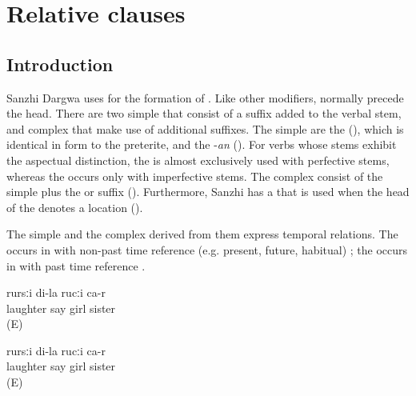 \chapter{Relative clauses}
\label{cpt:Relative clauses}



\section{Introduction}
\label{sec:relativeclausesintro}

Sanzhi Dargwa uses  for the formation of . Like other modifiers,  normally precede the head. There are two simple  that consist of a suffix added to the verbal stem, and complex  that make use of additional suffixes. The simple  are the  (), which is identical in form to the preterite, and the  -\textit{an} (). For verbs whose stems exhibit the aspectual distinction, the  is almost exclusively used with perfective stems, whereas the  occurs only with imperfective stems. The complex  consist of the simple  plus the   or suffix  (). Furthermore, Sanzhi has a  that is used when the head of the  denotes a location ().

The simple  and the complex  derived from them express temporal relations. The  occurs in  with non-past time reference (e.g. present, future, habitual) ; the  occurs in  with past time reference .
%
\begin{exe}
	\ex	\label{ex:The girl who is laughing is my sister}
	\gll	[ħaˁħaˁ	r-ik'ʷ-an]	rursːi	di-la	rucːi	ca-r\\
		laughter	say	girl		sister	\\
	\glt	{} (E)
	
	\ex	\label{ex:The girl who was laughing is my sister}
	\gll	[ħaˁħaˁ	r-ik'-ub]	rursːi	di-la	rucːi	ca-r\\
		laughter	say	girl		sister	\\
	\glt	{} (E)

\end{exe}


